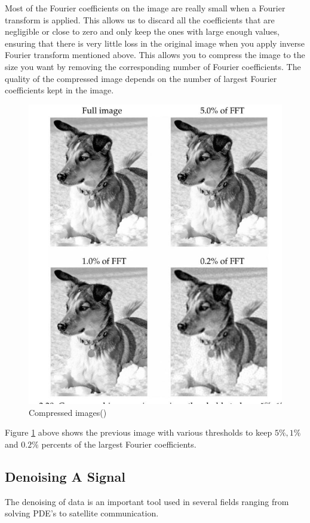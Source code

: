 \documentclass[11pt]{amsart}
\theoremstyle{definition}
\theoremstyle{remark}
\numberwithin{equation}{section}
\begin{document}
Most of the Fourier coefficients on the image are really small when a Fourier transform is applied. This allows us to discard all the coefficients that are negligible or close to zero and only keep the ones with large enough values, ensuring that there is very little loss in the original image when you apply inverse Fourier transform mentioned above. This allows you to compress the image to the size you want by removing the corresponding number of Fourier coefficients. The quality of the compressed image depends on the number of largest Fourier coefficients kept in the image. 
\begin{figure}[h]
     \centering
     \includegraphics[trim = 0 20 0 0,width=\linewidth, clip]{../pictures/Screenshot 2024-05-22 122030.png}
     \caption{Compressed images(\cite{Brunton_Kutz_2022})} \label{fig:2}
\end{figure}

Figure \ref{fig:2} above shows the previous image with various thresholds to keep $5\%, 1\%$ and $0.2\%$ percents of the largest Fourier coefficients.


\subsection{Denoising A Signal} 
The denoising of data is an important tool used in several fields ranging from solving PDE's to satellite communication. 
\end{document}
